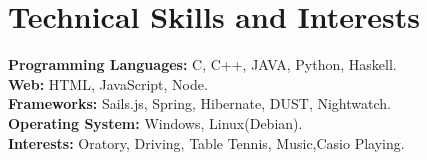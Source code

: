 \documentclass[a4paper,10pt]{article}
\begin{document}
\section{Technical Skills and Interests}
\textbf{Programming Languages:} C, C++, JAVA, Python, Haskell. \\
\textbf{Web:} HTML, JavaScript, Node.\\
\textbf{Frameworks:} Sails.js, Spring, Hibernate, DUST, Nightwatch.\\
\textbf{Operating System:} Windows, Linux(Debian).\\
\textbf{Interests:} Oratory, Driving, Table Tennis, Music,Casio Playing.\\
\end{document}
